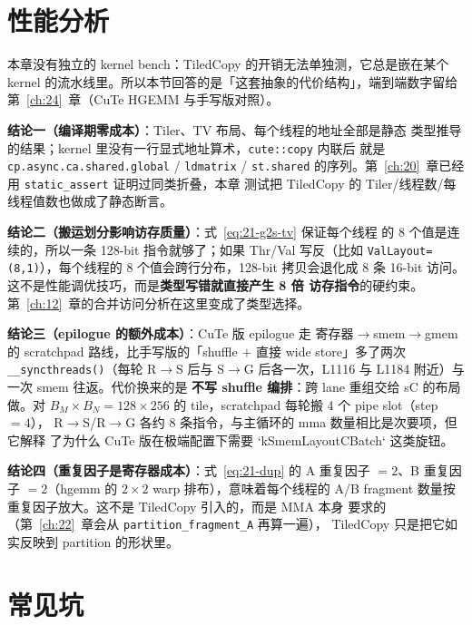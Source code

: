 \section{性能分析}

本章没有独立的 kernel bench：TiledCopy 的开销无法单独测，它总是嵌在某个
kernel 的流水线里。所以本节回答的是「这套抽象的代价结构」，端到端数字留给
第~\ref{ch:24}~章（CuTe HGEMM 与手写版对照）。

\textbf{结论一（编译期零成本）}：Tiler、TV 布局、每个线程的地址全部是静态
类型推导的结果；kernel 里没有一行显式地址算术，\texttt{cute::copy} 内联后
就是 \texttt{cp.\allowbreak{}async.\allowbreak{}ca.\allowbreak{}shared.\allowbreak{}global} / \texttt{ldmatrix} / \texttt{st.shared}
的序列。第~\ref{ch:20}~章已经用 \texttt{static\_\allowbreak{}assert} 证明过同类折叠，本章
测试把 TiledCopy 的 Tiler/线程数/每线程值数也做成了静态断言。

\textbf{结论二（搬运划分影响访存质量）}：式~\eqref{eq:21-g2s-tv} 保证每个线程
的 8 个值是连续的，所以一条 128-bit 指令就够了；如果 Thr/Val 写反（比如
\texttt{Val\allowbreak{}Layout=\allowbreak{}(8,\allowbreak{}1)}），每个线程的 8 个值会跨行分布，128-bit 拷贝会退化成
8 条 16-bit 访问。这不是性能调优技巧，而是\textbf{类型写错就直接产生 8 倍
访存指令}的硬约束。第~\ref{ch:12}~章的合并访问分析在这里变成了类型选择。

\textbf{结论三（epilogue 的额外成本）}：CuTe 版 epilogue 走
寄存器$\to$smem$\to$gmem 的 scratchpad 路线，比手写版的「shuffle $+$ 直接
wide store」多了两次 \texttt{\_\allowbreak{}\_\allowbreak{}syncthreads\allowbreak{}()}（每轮 R$\to$S 后与
S$\to$G 后各一次，L1116 与 L1184 附近）与一次 smem 往返。代价换来的是
\textbf{不写 shuffle 编排}：跨 lane 重组交给 sC 的布局做。对 $B_M\times B_N
=128\times256$ 的 tile，scratchpad 每轮搬 4 个 pipe slot（step $=4$），
R$\to$S/R$\to$G 各约 8 条指令，与主循环的 mma 数量相比是次要项，但它解释
了为什么 CuTe 版在极端配置下需要 `kSmemLayoutCBatch` 这类旋钮。

\textbf{结论四（重复因子是寄存器成本）}：式~\eqref{eq:21-dup} 的 A 重复因子
$=2$、B 重复因子 $=2$（hgemm 的 $2\times2$ warp 排布），意味着每个线程的
A/B fragment 数量按重复因子放大。这不是 TiledCopy 引入的，而是 MMA 本身
要求的（第~\ref{ch:22}~章会从 \texttt{partition\_\allowbreak{}fragment\_\allowbreak{}A} 再算一遍），
TiledCopy 只是把它如实反映到 partition 的形状里。

\section{常见坑}

